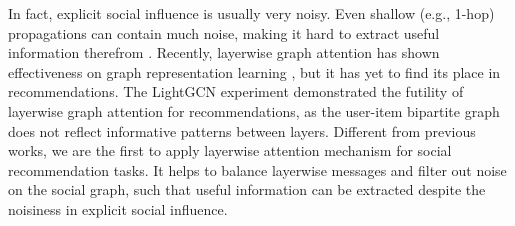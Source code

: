 \documentclass[letterpaper]{article} %
\begin{document}
In fact, explicit social influence is usually very noisy. Even shallow (e.g., 1-hop) propagations can contain much noise, making it hard to extract useful information therefrom  \cite{noisy1,noisy2}. Recently, layerwise graph attention has shown effectiveness on graph representation learning \cite{GGSNN, MLAP}, but it has yet to find its place in recommendations. The LightGCN experiment \cite{lightgcn} demonstrated the futility of layerwise graph attention for recommendations, as the user-item bipartite graph does not reflect informative patterns between layers. Different from previous works, we are the first to apply layerwise attention mechanism for social recommendation tasks. It helps to balance layerwise messages and filter out noise on the social graph, such that useful information can be extracted despite the noisiness in explicit social influence. 
\end{document}
